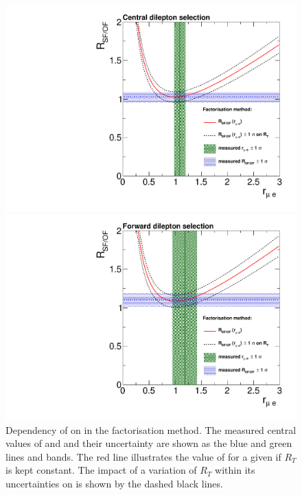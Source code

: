 \begin{figure}[htbp]
\centering
\begin{minipage}[t]{0.49\textwidth}
  \includegraphics[width=\textwidth]{plots/BG/rmue/rMuEPropaganda_central.pdf}
\end{minipage}
\begin{minipage}[t]{0.49\textwidth}
\includegraphics[width=\textwidth]{plots/BG/rmue/rMuEPropaganda_forward.pdf}
\end{minipage}

\caption{Dependency of \Rsfof on \rmue in the factorisation method. The measured central values of \Rsfof and \rmue and their uncertainty are shown as the blue and green lines and bands. The red line illustrates the value of \Rsfof for a given \rmue if $R_T$ is kept constant. The impact of a variation of $R_T$ within its uncertainties on \Rsfof is shown by the dashed black lines.}
\label{fig:rmuePropaganda}
\end{figure} 

